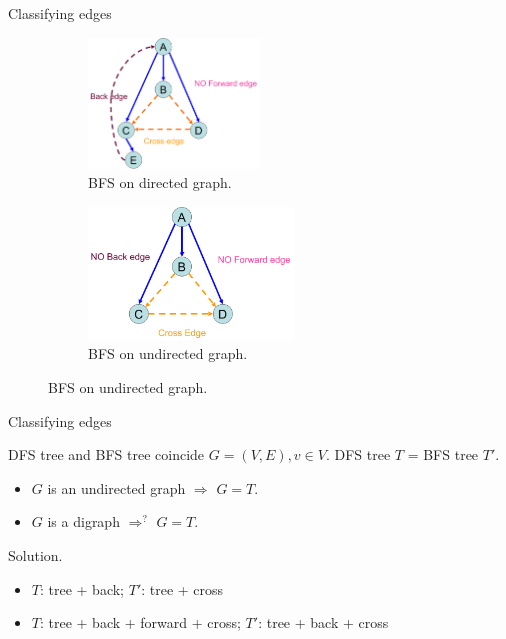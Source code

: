 \begin{frame}{Classifying edges }
\begin{figure}
    \begin{subfigure}{0.50\linewidth}
      \centering
      \includegraphics[width=0.50\textwidth]{figures/bfs-digraph.png}
      \caption{BFS on directed graph.}
    \end{subfigure}%
    \begin{subfigure}{0.50\linewidth}
      \centering
      \includegraphics[width=0.60\textwidth]{figures/bfs-undirected.png}
      \caption{BFS on undirected graph.}
    \end{subfigure}
  \end{figure}
\end{frame}
\begin{frame}{Classifying edges}
  \begin{exampleblock}{DFS tree and BFS tree coincide }
    $G = (V,E), v \in V$. DFS tree $T$ = BFS tree $T'$.

    \begin{itemize}
      \item $G$ is an undirected graph $\Rightarrow$ $G = T$.
      \item $G$ is a digraph $\Rightarrow^{?}$ $G = T$.
    \end{itemize}
  \end{exampleblock}

  \begin{block}{Solution.}
    \begin{itemize}
      \item $T$: tree + back; $T'$: tree + cross
      \item $T$: tree + back + forward + cross; $T'$: tree + back + cross 
    \end{itemize}
  \end{block}
\end{frame}
